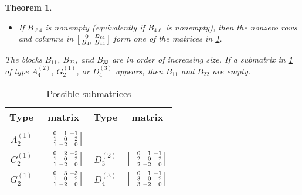 \documentclass{amsart}
\newtheorem{theorem}[proposition]{Theorem}
\theoremstyle{definition}
\theoremstyle{remark}
\numberwithin{equation}{section}
\newcommand{\0}{{\mathbf{0}}}
\begin{document}
\begin{theorem}
\begin{enumerate}[\quad\rm(i)]
\begin{itemize}
\item
If $B_{\ell4}$ is nonempty (equivalently if $B_{4\ell}$ is nonempty), then the nonzero rows and columns in $\begin{bsmallmatrix} 0 & B_{\ell4} \\ B_{4\ell} & B_{44} \end{bsmallmatrix}$ form one of the matrices in \cref{submat tab}.
\end{itemize}
The blocks $B_{11}$, $B_{22}$, and $B_{33}$ are in order of increasing size. 
If a submatrix in \cref{submat tab} of type $A_{4}^{(2)}$, $G_{2}^{(1)}$, or $D_{4}^{(3)}$ appears, then $B_{11}$ and $B_{22}$ are empty.
\end{enumerate}
\end{theorem}
	\begin{table}
	\caption{Possible submatrices}
	\label{submat tab}	
	\begin{tabular}{|cc|cc|}
	Type & matrix & Type & matrix \\
	\hline & & & \\[-1ex]
	$A_{2}^{(1)}$ & $\begin{bsmallmatrix*}[r]
	0 & 1 & -1 \\
	-1 & 0 & 2 \\
	1 & -2 & 0
	\end{bsmallmatrix*}$ & & \\[4ex]
	$C_{2}^{(1)}$ & $\begin{bsmallmatrix*}[r]
	0 & 2 & -2 \\
	-1 & 0 & 2 \\
	1 & -2 & 0
	\end{bsmallmatrix*}$ &
	$D_{3}^{(2)}$ & $\begin{bsmallmatrix*}[r]
	0 & 1 & -1 \\
	-2 & 0 & 2 \\
	2 & -2 & 0
	\end{bsmallmatrix*}$ \\[4ex]
	$G_2^{(1)}$ & $\begin{bsmallmatrix*}[r]
	0 & 3 & -3 \\
	-1 & 0 & 2 \\
	1 & -2 & 0
	\end{bsmallmatrix*}$ &
	$D_4^{(3)}$ & $\begin{bsmallmatrix*}[r]
	0 & 1 & -1 \\
	-3 & 0 & 2 \\
	3 & -2 & 0
	\end{bsmallmatrix*}$ \\[4ex]

\end{tabular}
\end{table}
\end{document}
